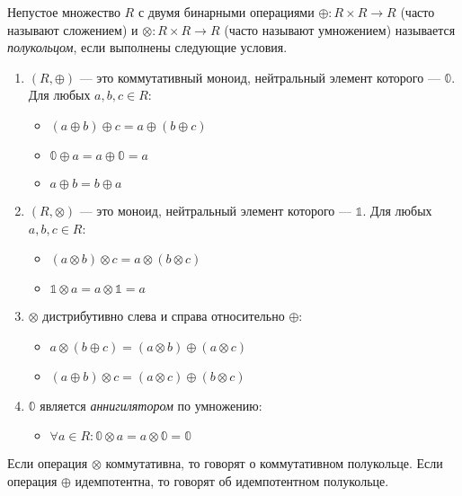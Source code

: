 \begin{definition}

Непустое множество $R$ с двумя бинарными операциями $\oplus \colon R \times R \to R$ (часто называют сложением) и $\otimes \colon R \times R \to R$ (часто называют умножением) называется \emph{полукольцом}, если выполнены следующие условия.
\begin{enumerate}

\item $(R, \oplus)$ --- это коммутативный моноид, нейтральный элемент которого --- $\mathbb{0}$. Для любых $a,b,c \in R$:
\begin{itemize}
	\item $(a \oplus b) \oplus c = a \oplus (b \oplus c)$
	\item $\mathbb{0} \oplus a = a \oplus \mathbb{0} = a$
	\item $a \oplus b = b \oplus a$
\end{itemize}

\item $(R, \otimes)$ --- это моноид, нейтральный элемент которого --- $\mathbb{1}$. Для любых $a,b,c \in R$:
\begin{itemize}
	\item $(a \otimes b) \otimes c = a \otimes (b \otimes c)$
    \item $\mathbb{1} \otimes a = a \otimes \mathbb{1} = a$
\end{itemize}

\item $\otimes$ дистрибутивно слева и справа относительно $\oplus$:
\begin{itemize}
	\item $a \otimes (b \oplus c) = (a \otimes b) \oplus (a \otimes c)$
    \item $(a \oplus b) \otimes c = (a \otimes c) \oplus (b \otimes c)$
\end{itemize}


\item $\mathbb{0}$ является \textit{аннигилятором} по умножению:
\begin{itemize}
	\item $\forall a \in R: \mathbb{0} \otimes a = a \otimes \mathbb{0} = \mathbb{0}$
\end{itemize}

\end{enumerate}

Если операция $\otimes$ коммутативна, то говорят о коммутативном полукольце.
Если операция $\oplus$ идемпотентна, то говорят об идемпотентном полукольце.

\end{definition}

